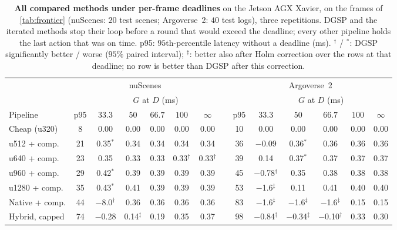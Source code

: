 \documentclass[10pt,letterpaper]{article}
\newcommand{\method}{DGSP\xspace}
\newcommand{\G}{G}
\theoremstyle{remark}
\theoremstyle{plain}
\theoremstyle{definition}
\begin{document}
\begin{table}[!htbp]
\centering
\caption{\textbf{All compared methods under per-frame deadlines} on the Jetson AGX Xavier, on the frames of \cref{tab:frontier} (nuScenes: $20$ test scenes; Argoverse~2: $40$ test logs), three repetitions. \method and the iterated methods stop their loop before a round that would exceed the deadline; every other pipeline holds the last action that was on time. p95: $95$th-percentile latency without a deadline (ms). $^{\dagger}$ / $^{\ast}$: \method significantly better / worse ($95\%$ paired interval); $^{\ddagger}$: better also after Holm correction over the rows at that deadline; no row is better than \method after this correction.}
\label{tab:deadline_all}
\footnotesize
\setlength{\tabcolsep}{2.2pt}
\begin{tabular}{@{}lccccccccccccc@{}}
\toprule
 & \multicolumn{6}{c}{nuScenes} & & \multicolumn{6}{c}{Argoverse~2} \\
\cmidrule(lr){2-7}\cmidrule(l){9-14}
 & & \multicolumn{5}{c}{$\G$ at $D$ (ms)} & & & \multicolumn{5}{c}{$\G$ at $D$ (ms)} \\
\cmidrule(lr){3-7}\cmidrule(l){10-14}
Pipeline & p95 & $33.3$ & $50$ & $66.7$ & $100$ & $\infty$ & & p95 & $33.3$ & $50$ & $66.7$ & $100$ & $\infty$ \\
\midrule
Cheap (u320) & 8 & 0.00 & 0.00 & 0.00 & 0.00 & 0.00 & & 10 & 0.00 & 0.00 & 0.00 & 0.00 & 0.00 \\
u512 + comp. & 21 & 0.35$^{\ast}$ & 0.34 & 0.34 & 0.34 & 0.34 & & 36 & $-$0.09 & 0.36$^{\ast}$ & 0.36 & 0.36 & 0.36 \\
u640 + comp. & 23 & 0.35 & 0.33 & 0.33 & 0.33$^{\dagger}$ & 0.33$^{\dagger}$ & & 39 & 0.14 & 0.37$^{\ast}$ & 0.37 & 0.37 & 0.37 \\
u960 + comp. & 29 & 0.42$^{\ast}$ & 0.39 & 0.39 & 0.39 & 0.39 & & 45 & $-$0.78$^{\dagger}$ & 0.35 & 0.38 & 0.38 & 0.38 \\
u1280 + comp. & 35 & 0.43$^{\ast}$ & 0.41 & 0.39 & 0.39 & 0.39 & & 53 & $-$1.6$^{\ddagger}$ & 0.11 & 0.41 & 0.40 & 0.40 \\
Native + comp. & 44 & $-$8.0$^{\dagger}$ & 0.36 & 0.36 & 0.36 & 0.36 & & 83 & $-$1.6$^{\ddagger}$ & $-$1.6$^{\ddagger}$ & $-$1.6$^{\ddagger}$ & 0.15 & 0.15 \\
\midrule
Hybrid, capped & 74 & $-$0.28 & 0.14$^{\ddagger}$ & 0.19 & 0.35 & 0.37 & & 98 & $-$0.84$^{\dagger}$ & $-$0.34$^{\ddagger}$ & $-$0.10$^{\dagger}$ & 0.33 & 0.30 \\

\end{tabular}
\end{table}
\end{document}
